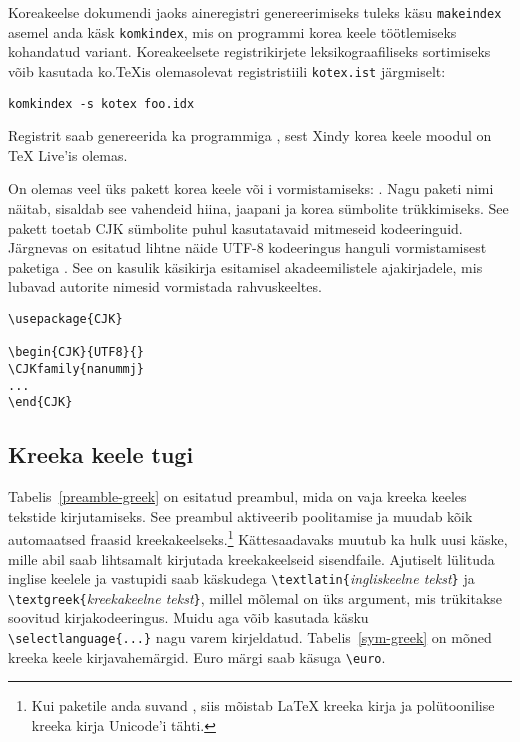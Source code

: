 Koreakeelse dokumendi jaoks aineregistri genereerimiseks tuleks käsu
\texttt{makeindex} asemel anda käsk \texttt{komkindex}, mis on programmi
 korea keele töötlemiseks kohandatud variant.
Koreakeelsete registrikirjete leksikograafiliseks sortimiseks võib
kasutada ko.\TeX is olemasolevat registristiili \texttt{kotex.ist}
järgmiselt:

\begin{lscommand}
\verb|komkindex -s kotex foo.idx|
\end{lscommand}

Registrit saab genereerida ka programmiga , sest
Xindy korea keele moodul on \TeX{} Live'is olemas.

On olemas veel üks pakett korea keele või i vormistamiseks:
. Nagu paketi nimi näitab, sisaldab see vahendeid hiina,
jaapani ja korea sümbolite trükkimiseks. See pakett toetab CJK sümbolite
puhul kasutatavaid mitmeseid kodeeringuid. Järgnevas on esitatud lihtne
näide UTF-8 kodeeringus hanguli vormistamisest paketiga . See
on kasulik käsikirja esitamisel akadeemilistele ajakirjadele, mis
lubavad autorite nimesid vormistada rahvuskeeltes.

\begin{code}
\begin{verbatim}
\usepackage{CJK}

\begin{CJK}{UTF8}{}
\CJKfamily{nanummj}
...
\end{CJK}
\end{verbatim}
\end{code}

\subsection{Kreeka keele tugi}
Tabelis~\ref{preamble-greek} on esitatud preambul, mida on vaja
kreeka keeles tekstide kirjutamiseks. See preambul
aktiveerib poolitamise ja muudab kõik automaatsed fraasid
kreekakeelseks.\footnote{Kui paketile  anda suvand
, siis mõistab \LaTeX{} kreeka kirja ja polütoonilise
kreeka kirja Unicode'i tähti.} Kättesaadavaks muutub ka hulk uusi käske,
mille abil saab lihtsamalt kirjutada kreekakeelseid sisendfaile.
Ajutiselt lülituda inglise keelele ja vastupidi saab käskudega
\verb|\textlatin{|\emph{ingliskeelne tekst}\verb|}| ja
\verb|\textgreek{|\emph{kreekakeelne tekst}\verb|}|, millel mõlemal on
üks argument, mis trükitakse soovitud kirjakodeeringus. Muidu aga võib
kasutada käsku \verb|\selectlanguage{...}| nagu varem kirjeldatud.
Tabelis~\ref{sym-greek} on mõned kreeka keele kirjavahemärgid. Euro
märgi saab käsuga \verb|\euro|.

